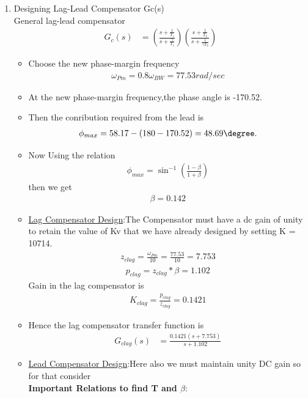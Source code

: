 \begin{enumerate}[label=\thesubsection.\arabic*.,ref=\thesubsection.\theenumi]
\item 
Designing Lag-Lead Compensator Gc(s)
\\
\solution 
General lag-lead compensator 
\begin{align}
G_{c}(s) &= \left(\frac{s+\frac{1}{T_1}}{s+\frac{\gamma}{T_1}}\right)\left(\frac{s+\frac{1}{T_2}}{s+\frac{1}{\gamma T_2}}\right) 
\end{align}
\begin{itemize}
\item Choose the new phase-margin frequency 
\begin{align}
    \omega_{Pm} = 0.8\omega_{BW} = 77.53 rad/sec
\end{align}
\item At the new phase-margin frequency,the phase angle is -170.52\degree.
\item Then the conribution required from the lead is
\begin{align}
    \phi_{max} = 58.17-(180-170.52)=48.69\degree.
\end{align}
\item Now Using the relation 
\begin{align}
    \phi_{max} = \sin^{-1}(\frac{1-\beta}{1+\beta})
\end{align}
then we get
\begin{align}
    \beta=0.142
\end{align}
\item \underline{Lag Compensator Design}:The Compensator must have a dc gain of unity to retain the value of Kv that we have already designed by setting K = 10714.
\begin{align}
    z_{clag}=\frac{\omega_{Pm}}{10}=\frac{77.53}{10}=7.753
\end{align}
\begin{align}
    p_{clag}=z_{clag}*\beta=1.102
\end{align}
Gain in the lag compensator is 
\begin{align}
    K_{clag} = \frac{p_{clag}}{z_{clag}}=0.1421
\end{align}
\item Hence the lag compensator transfer function is
\begin{align}
 G_{clag}(s) &= \frac{0.1421(s+7.753)}{s+1.102} 
\end{align}
\item \underline{Lead Compensator Design}:Here also we must maintain unity DC gain so for that consider\\
\textbf{Important Relations to find T and $\beta$}:

\end{itemize}
\end{enumerate}
